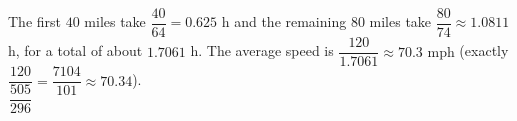 The first $40$ miles take $\dfrac{40}{64}=0.625$ h and the remaining $80$ miles take $\dfrac{80}{74}\approx1.0811$ h, for a total of about $1.7061$ h. The average speed is $\dfrac{120}{1.7061}\approx\boxed{70.3\text{ mph}}$ (exactly $\dfrac{120}{\dfrac{505}{296}}=\dfrac{7104}{101}\approx70.34$).
